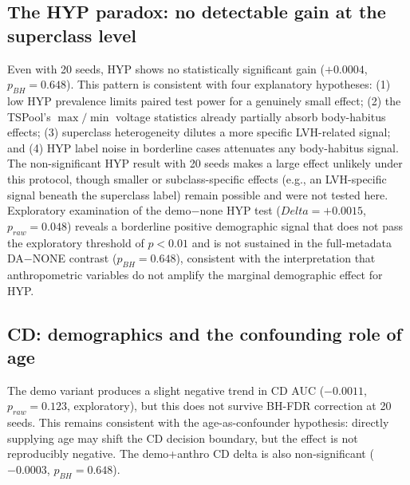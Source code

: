 \documentclass[mathematics,article,submit,pdftex]{Definitions/mdpi}
\def\texttt#1{#1}%
\def\mathrm#1{#1}%
\def\textbf#1{#1}%
\def\Delta{Delta }%
\begin{document}
\subsection{The HYP paradox: no detectable gain at the superclass level}
Even with 20 seeds, \textbf{HYP shows no statistically significant gain} ($+0.0004$, $p_{\mathrm{BH}}{=}0.648$). This pattern is consistent with four explanatory hypotheses: (1) low HYP prevalence limits paired test power for a genuinely small effect; (2) the TSPool's $\max/\min$ voltage statistics already partially absorb body-habitus effects; (3) superclass heterogeneity dilutes a more specific LVH-related signal; and (4) HYP label noise in borderline cases attenuates any body-habitus signal. The non-significant HYP result with 20 seeds makes a large effect unlikely under this protocol, though smaller or subclass-specific effects (e.g., an LVH-specific signal beneath the superclass label) remain possible and were not tested here. Exploratory examination of the \texttt{demo}$-$\texttt{none} HYP test ($\Delta{=}+0.0015$, $p_{\mathrm{raw}}{=}0.048$) reveals a borderline positive demographic signal that does not pass the exploratory threshold of $p{<}0.01$ and is not sustained in the full-metadata DA$-$NONE contrast ($p_{\mathrm{BH}}{=}0.648$), consistent with the interpretation that anthropometric variables do not amplify the marginal demographic effect for HYP.

\subsection{CD: demographics and the confounding role of age}
The \texttt{demo} variant produces a slight negative trend in CD AUC ($-0.0011$, $p_{\mathrm{raw}}{=}0.123$, exploratory), but this does not survive BH-FDR correction at 20 seeds. This remains consistent with the age-as-confounder hypothesis: directly supplying age may shift the CD decision boundary, but the effect is not reproducibly negative. The \texttt{demo+anthro} CD delta is also non-significant ($-0.0003$, $p_{\mathrm{BH}}{=}0.648$).
\end{document}
